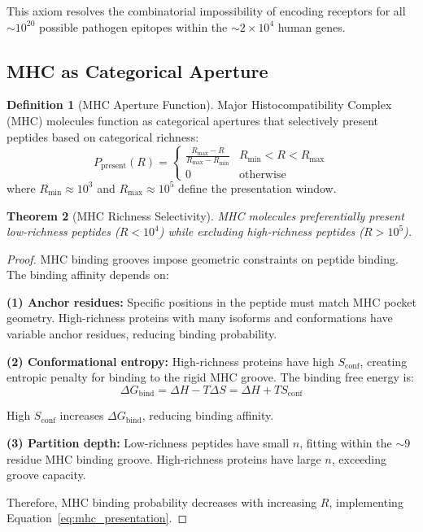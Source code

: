\documentclass[11pt,twocolumn,a4paper]{article}
\newtheorem{theorem}{Theorem}[section]
\theoremstyle{definition}
\newtheorem{definition}[theorem]{Definition}
\theoremstyle{remark}
\begin{document}
This axiom resolves the combinatorial impossibility of encoding receptors for all $\sim 10^{20}$ possible pathogen epitopes within the $\sim 2 \times 10^4$ human genes.

\subsection{MHC as Categorical Aperture}

\begin{definition}[MHC Aperture Function]
\label{def:mhc_aperture}
Major Histocompatibility Complex (MHC) molecules function as categorical apertures that selectively present peptides based on categorical richness:
\begin{equation}
P_{\mathrm{present}}(R) = \begin{cases}
\displaystyle \frac{R_{\max} - R}{R_{\max} - R_{\min}} & R_{\min} < R < R_{\max} \\[8pt]
0 & \text{otherwise}
\end{cases}
\label{eq:mhc_presentation}
\end{equation}
where $R_{\min} \approx 10^3$ and $R_{\max} \approx 10^5$ define the presentation window.
\end{definition}

\begin{theorem}[MHC Richness Selectivity]
\label{thm:mhc_selectivity}
MHC molecules preferentially present low-richness peptides ($R < 10^4$) while excluding high-richness peptides ($R > 10^5$).
\end{theorem}

\begin{proof}
MHC binding grooves impose geometric constraints on peptide binding. The binding affinity depends on:

\textbf{(1) Anchor residues:} Specific positions in the peptide must match MHC pocket geometry. High-richness proteins with many isoforms and conformations have variable anchor residues, reducing binding probability.

\textbf{(2) Conformational entropy:} High-richness proteins have high $S_{\mathrm{conf}}$, creating entropic penalty for binding to the rigid MHC groove. The binding free energy is:
\begin{equation}
\Delta G_{\mathrm{bind}} = \Delta H - T\Delta S = \Delta H + T S_{\mathrm{conf}}
\label{eq:binding_free_energy}
\end{equation}

High $S_{\mathrm{conf}}$ increases $\Delta G_{\mathrm{bind}}$, reducing binding affinity.

\textbf{(3) Partition depth:} Low-richness peptides have small $n$, fitting within the $\sim 9$ residue MHC binding groove. High-richness proteins have large $n$, exceeding groove capacity.

Therefore, MHC binding probability decreases with increasing $R$, implementing Equation~\eqref{eq:mhc_presentation}.
\end{proof}
\end{document}
